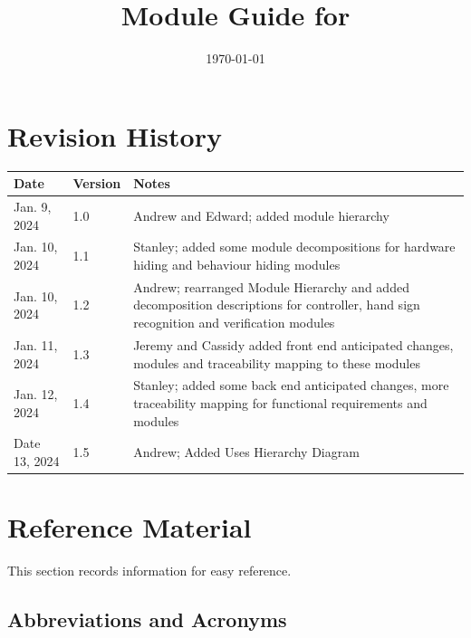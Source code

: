 \documentclass[12pt, titlepage]{article}
\begin{document}
\title{Module Guide for \progname{}} 
\author{\authname}
\date{\today}

\maketitle


\section{Revision History}

\begin{tabularx}{\textwidth}{p{3cm}p{2cm}X}
\toprule {\bf Date} & {\bf Version} & {\bf Notes}\\
\midrule
Jan. 9, 2024 & 1.0 & Andrew and Edward; added module hierarchy\\
Jan. 10, 2024 & 1.1 & Stanley; added some module decompositions for hardware hiding and behaviour hiding modules\\
Jan. 10, 2024 & 1.2 & Andrew; rearranged Module Hierarchy and added decomposition descriptions for controller, hand sign recognition and verification modules\\
Jan. 11, 2024 & 1.3 & Jeremy and Cassidy added front end anticipated changes, modules and traceability mapping to these modules\\
Jan. 12, 2024 & 1.4 & Stanley; added some back end anticipated changes, more traceability mapping for functional requirements and modules\\
Date 13, 2024 & 1.5 & Andrew; Added Uses Hierarchy Diagram\\
\bottomrule
\end{tabularx}

\newpage

\section{Reference Material}

This section records information for easy reference.

\subsection{Abbreviations and Acronyms}
\end{document}
